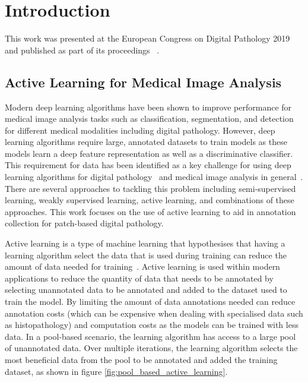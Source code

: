 \section{Introduction}
This work was presented at the European Congress on Digital Pathology 2019 and published as part of its proceedings ~\citep{carse2019active}.

\subsection{Active Learning for Medical Image Analysis}
Modern deep learning algorithms have been shown to improve performance for medical image analysis tasks such as classification, segmentation, and detection for different medical modalities including digital pathology. However, deep learning algorithms require large, annotated datasets to train models as these models learn a deep feature representation as well as a discriminative classifier. This requirement for data has been identified as a key challenge for using deep learning algorithms for digital pathology~\citep{tizhoosh2018artificial} and medical image analysis in general~\citep{litjens2017survey}. There are several approaches to tackling this problem including semi-supervised learning, weakly supervised learning, active learning, and combinations of these approaches. This work focuses on the use of active learning to aid in annotation collection for patch-based digital pathology.

Active learning is a type of machine learning that hypothesises that having a learning algorithm select the data that is used during training can reduce the amount of data needed for training~\citep{settles2012active}. Active learning is used within modern applications to reduce the quantity of data that needs to be annotated by selecting unannotated data to be annotated and added to the dataset used to train the model. By limiting the amount of data annotations needed can reduce annotation costs (which can be expensive when dealing with specialised data such as histopathology) and computation costs as the models can be trained with less data. In a pool-based scenario, the learning algorithm has access to a large pool of unannotated data. Over multiple iterations, the learning algorithm selects the most beneficial data from the pool to be annotated and added the training dataset, as shown in figure \ref{fig:pool_based_active_learning}.


